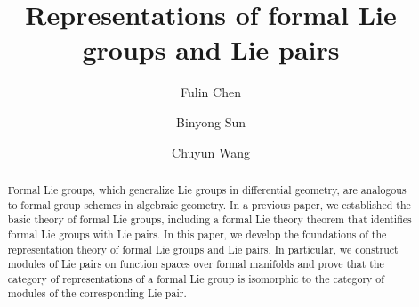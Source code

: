 \documentclass[12pt, a4paper]{amsart}
\theoremstyle{Theorem}
\theoremstyle{Theorem}
\theoremstyle{Theorem}
\theoremstyle{Theorem}
\theoremstyle{Plain}
\theoremstyle{remark}
\theoremstyle{remark}
\theoremstyle{Definition}
\numberwithin{equation}{section}
\begin{document}
\title[Modules of Lie pairs and representations of formal Lie groups]{ %
Representations of formal Lie groups and Lie pairs}

\author[F. Chen]{Fulin Chen}
\address{School of Mathematical Sciences, Xiamen University,
 Xiamen, 361005, China} 


\author[B. Sun]{Binyong Sun}
\address{Institute for Advanced Study in Mathematics and New Cornerstone Science Laboratory, Zhejiang University,  Hangzhou, 310058, China}

\author[C. Wang]{Chuyun Wang}
\address{School of Mathematics and Statistics, Hainan University, Haikou, 570228, China}

 

\begin{abstract}
Formal Lie groups, which generalize Lie groups in differential geometry, are analogous to formal group schemes in algebraic geometry.
In a previous paper, we established the basic theory of formal Lie groups, including a formal Lie theory theorem that identifies formal Lie groups with Lie pairs.  In this paper, we develop the foundations of the representation theory of formal Lie groups and Lie pairs. 
In particular, we construct modules of Lie pairs on function spaces over formal manifolds and prove that the category of representations of a formal Lie group is isomorphic to the category of modules of the corresponding Lie pair.
\end{abstract}
\end{document}
